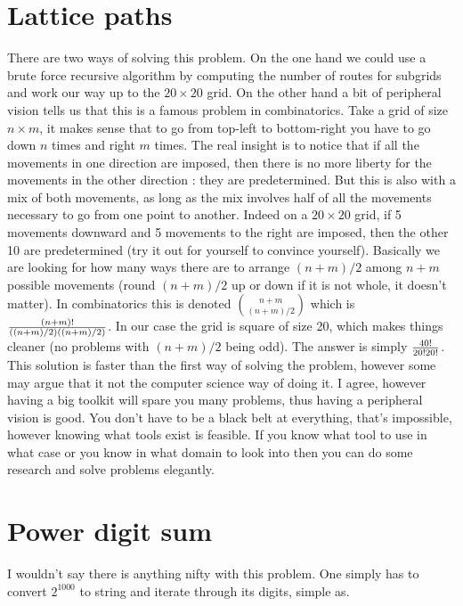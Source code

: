 \documentclass[11pt]{article}
\begin{document}
\section{Lattice paths} 
There are two ways of solving this problem. On the one hand we could use a brute force recursive algorithm by computing the number of routes for subgrids and work our way up to the $20 \times 20$ grid. On the other hand a bit of peripheral vision tells us that this is a famous problem in combinatorics. Take a grid of size $n \times m$, it makes sense that to go from top-left to bottom-right you have to go down $n$ times and right $m$ times. The real insight is to notice that if all the movements in one direction are imposed, then there is no more liberty for the movements in the other direction : they are predetermined. But this is also with a mix of both movements, as long as the mix involves half of all the movements necessary to go from one point to another. Indeed on a $20 \times 20$ grid, if 5 movements downward and 5 movements to the right are imposed, then the other 10 are predetermined (try it out for yourself to convince yourself). Basically we are looking for how many ways there are to arrange $(n+m)/2$ among $n+m$ possible movements (round $(n+m)/2$ up or down if it is not whole, it doesn't matter). In combinatorics this is denoted $n+m \choose {(n+m)/2}$ which is $(n+m)! \over {((n+m)/2)((n+m)/2)}$. In our case the grid is square of size 20, which makes things cleaner (no problems with $(n+m)/2$ being odd). The answer is simply $40! \over {20!20!}$. This solution is faster than the first way of solving the problem, however some may argue that it not the computer science way of doing it. I agree, however having a big toolkit will spare you many problems, thus having a peripheral vision is good. You don't have to be a black belt at everything, that's impossible, however knowing what tools exist is feasible. If you know what tool to use in what case or you know in what domain to look into then you can do some research and solve problems elegantly.

\section{Power digit sum}
I wouldn't say there is anything nifty with this problem. One simply has to convert $2^{1000}$ to string and iterate through its digits, simple as.
\end{document}
